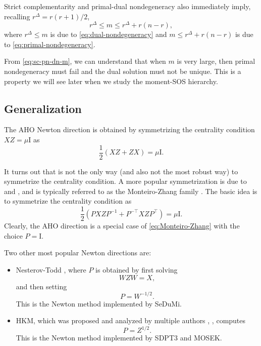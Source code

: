 \documentclass[
]{book}
\theoremstyle{definition}
\theoremstyle{definition}
\theoremstyle{definition}
\theoremstyle{definition}
\theoremstyle{remark}
\begin{document}
Strict complementarity and primal-dual nondegeneracy also immediately imply, recalling \(r^{\Delta} = r(r+1)/2\),
\begin{equation}
r^{\Delta} \leq m \leq r^{\Delta} + r (n - r),
\label{eq:sc-pn-dn-m}
\end{equation}
where \(r^\Delta \leq m\) is due to \eqref{eq:dual-nondegeneracy} and \(m \leq r^{\Delta} + r (n - r)\) is due to \eqref{eq:primal-nondegeneracy}.

From \eqref{eq:sc-pn-dn-m}, we can understand that when \(m\) is very large, then primal nondegeneracy must fail and the dual solution must not be unique. This is a property we will see later when we study the moment-SOS hierarchy.

\subsection{Generalization}\label{generalization}

The AHO Newton direction is obtained by symmetrizing the centrality condition \(XZ = \mu \mathrm{I}\) as
\[
\frac{1}{2}(XZ + ZX) = \mu \mathrm{I}.
\]

It turns out that is not the only way (and also not the most robust way) to symmetrize the centrality condition. A more popular symmetrization is due to \citep{monteiro97siopt-primal} and \citep{zhang98siopt-extending}, and is typically referred to as the Monteiro-Zhang family \citep{monteiro98siopt-polynomial}. The basic idea is to symmetrize the centrality condition as
\begin{equation}
\frac{1}{2}(P XZ P^{-1}+ P^{-\top}XZ P^\top) = \mu \mathrm{I}.
\label{eq:Monteiro-Zhang}
\end{equation}
Clearly, the AHO direction is a special case of \eqref{eq:Monteiro-Zhang} with the choice \(P = \mathrm{I}\).

Two other most popular Newton directions are:

\begin{itemize}
\item
  Nesterov-Todd \citep{todd98siopt-nesterov}, where \(P\) is obtained by first solving
  \[
  WZW = X, 
  \]
  and then setting
  \[
  P = W^{-1/2}.
  \]
  This is the Newton method implemented by SeDuMi.
\item
  HKM, which was proposed and analyzed by multiple authors \citep{helmberg96siopt-interior}, \citep{kojima97siopt-interior}, computes
  \[
  P = Z^{1/2}.
  \]
  This is the Newton method implemented by SDPT3 and MOSEK.
\end{itemize}
\end{document}
